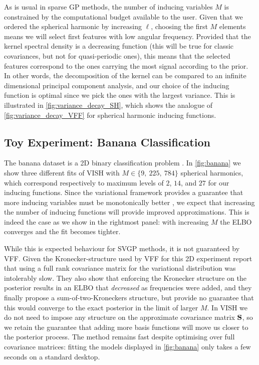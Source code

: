 As is usual in sparse GP methods, the number of inducing variables $M$ is constrained by the computational budget available to the user. Given that we ordered the spherical harmonic by increasing $\ell$, choosing the first $M$ elements means we will select first features with low angular frequency. Provided that the kernel spectral density is a decreasing function (this will be true for classic covariances, but not for quasi-periodic ones), this means that the selected features correspond to the ones carrying the most signal according to the prior. In other words, the decomposition of the kernel can be compared to an infinite dimensional principal component analysis, and our choice of the inducing function is optimal since we pick the ones with the largest variance. This is illustrated in \cref{fig:variance_decay_SH}, which shows the analogue of \cref{fig:variance_decay_VFF} for spherical harmonic inducing functions.

\subsection{Toy Experiment: Banana Classification}

The banana dataset is a 2D binary classification problem \citep{hensman2015scalable}. In \cref{fig:banana} we show three different fits of VISH with $M\in \{9,\ 225,\ 784\}$ spherical harmonics, which correspond respectively to maximum levels of $2$, $14$, and $27$ for our inducing functions. Since the variational framework provides a guarantee that more inducing variables must be monotonically better \citep{titsias2009}, we expect that increasing the number of inducing functions will provide improved approximations. This is indeed the case as we show in the rightmost panel: with increasing $M$ the ELBO converges and the fit becomes tighter.

While this is expected behaviour for SVGP methods, it is not guaranteed by VFF. Given the Kronecker-structure used by VFF for this 2D experiment \citet{hensman2017variational} report that using a full rank covariance matrix for the variational distribution was intolerably slow. They also show that enforcing the Kronecker structure on the posterior results in an ELBO that {\em decreased} as frequencies were added, and they finally propose a sum-of-two-Kroneckers structure, but provide no guarantee that this would converge to the exact posterior in the limit of larger $M$. In VISH we do not need to impose any structure on the approximate covariance matrix $\mathbf{{S}}$, so we retain the guarantee that adding more basis functions will move us closer to the posterior process. The method remains fast despite optimising over full covariance matrices: fitting the models displayed in \cref{fig:banana} only takes a few seconds on a standard desktop.

